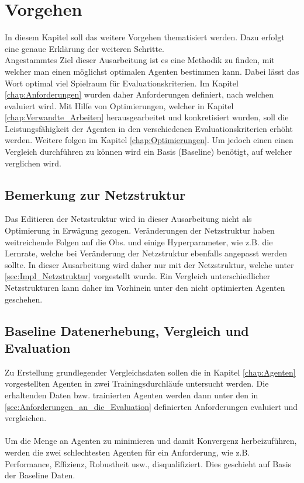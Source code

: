 \chapter{Vorgehen} \label{chap:Vorgehen}
In diesem Kapitel soll das weitere Vorgehen thematisiert werden. Dazu erfolgt eine genaue Erklärung der weiteren Schritte.\\
Angestammtes Ziel dieser Ausarbeitung ist es eine Methodik zu finden, mit welcher man einen möglichst optimalen Agenten bestimmen kann. Dabei lässt das Wort optimal viel Spielraum für Evaluationskriterien. Im Kapitel \ref{chap:Anforderungen} wurden daher Anforderungen definiert, nach welchen evaluiert wird. Mit Hilfe von Optimierungen, welcher in Kapitel \ref{chap:Verwandte_Arbeiten} herausgearbeitet und konkretisiert wurden, soll die Leistungsfähigkeit der Agenten in den verschiedenen Evaluationskriterien erhöht werden. Weitere folgen im Kapitel \ref{chap:Optimierungen}. Um jedoch einen einen Vergleich durchführen zu können wird ein Basis (Baseline) benötigt, auf welcher verglichen wird.

\section{Bemerkung zur Netzstruktur}
Das Editieren der Netzstruktur wird in dieser Ausarbeitung nicht als Optimierung in Erwägung gezogen. Veränderungen der Netzstruktur haben weitreichende Folgen auf die Obs. und einige Hyperparameter, wie z.B. die Lernrate, welche bei Veränderung der Netzstruktur ebenfalls angepasst werden sollte. In dieser Ausarbeitung wird daher nur mit der Netzstruktur, welche unter \ref{sec:Impl_Netzstruktur} vorgestellt wurde.
Ein Vergleich unterschiedlicher Netzstrukturen kann daher im Vorhinein unter den nicht optimierten Agenten geschehen.

\section{Baseline Datenerhebung, Vergleich und Evaluation}
Zu Erstellung grundlegender Vergleichsdaten sollen die in Kapitel \ref{chap:Agenten} vorgestellten Agenten in zwei Trainingsdurchläufe untersucht werden. Die erhaltenden Daten bzw. trainierten Agenten werden dann unter den in \ref{sec:Anforderungen_an_die_Evaluation} definierten Anforderungen evaluiert und vergleichen.\\
\\Um die Menge an Agenten zu minimieren und damit Konvergenz herbeizuführen, werden die zwei schlechtesten Agenten für ein Anforderung, wie z.B. Performance, Effizienz, Robustheit usw., disqualifiziert. Dies geschieht auf Basis der Baseline Daten.

